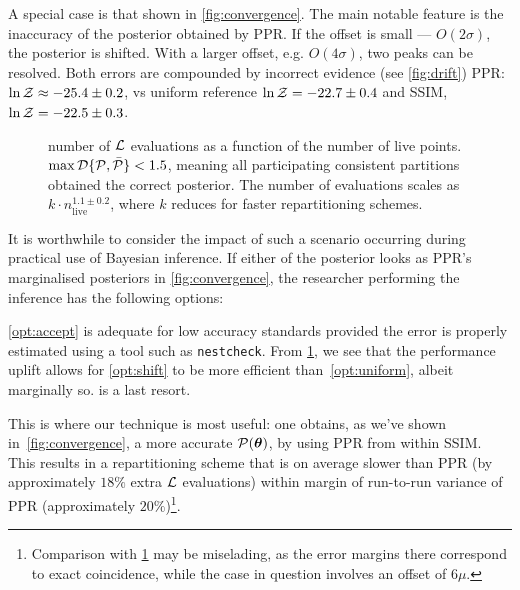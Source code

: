 \documentclass[usenatbib]{mnras}
\begin{document}
A special case is that shown in \cref{fig:convergence}. The main
notable feature is the inaccuracy of the posterior obtained by PPR. If
the offset is small --- \(O(2\sigma)\), the posterior is shifted. With
a larger offset, e.g. \(O(4\sigma)\), two peaks can be resolved.  Both
errors are compounded by incorrect evidence (see \cref{fig:drift})
PPR: \(\ln {\cal Z}\approx -25.4 \pm 0.2\), vs uniform reference
\(\ln {\cal Z} = -22.7 \pm 0.4\) and SSIM,
\(\ln {\cal Z} = -22.5 \pm 0.3\).


\begin{figure}
  
  \caption{number of ${\cal L}$ evaluations as a function of the
    number of live points.
    \(\max {\cal D}\{{\cal P}, \bar{\cal P}\} < 1.5\), meaning all
    participating consistent partitions obtained the correct
    posterior. The number of evaluations scales as
    $k\cdot n_\text{live}^{1.1 \pm 0.2}$, where $k$ reduces for faster
    repartitioning schemes. \label{fig:benchmark}}
\end{figure}


It is worthwhile to consider the impact of such a scenario occurring
during practical use of Bayesian inference. If either of the posterior
looks as PPR's marginalised posteriors in \cref{fig:convergence}, the
researcher performing the inference has the following options:
\vref{opt:accept} is adequate for low accuracy standards provided the
error is properly estimated using a tool such as \texttt{nestcheck}.
From \cref{fig:benchmark}, we see that the performance uplift allows
for \cref{opt:shift} to be more efficient than~\ref{opt:uniform},
albeit marginally so.  is a last resort.

This is where our technique is most useful: one obtains, as we've
shown in~\cref{fig:convergence}, a more accurate
\({\cal P}(\bm{\theta})\), by using PPR from within SSIM. This results
in a repartitioning scheme that is on average slower than PPR (by
approximately \(18\%\) extra \({\cal L}\) evaluations) within margin
of run-to-run variance of PPR (approximately
\(20\%\))\footnote{Comparison with \cref{fig:benchmark} may be
  miselading, as the error margins there correspond to exact
  coincidence, while the case in question involves an offset of
  $6\mu$. }.
\end{document}
